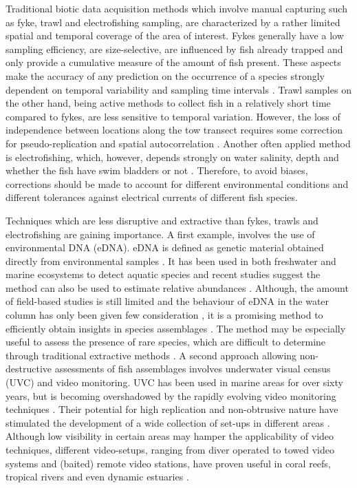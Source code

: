 \documentclass[12pt,authoryear]{elsarticle}
\begin{document}
Traditional biotic data acquisition methods which involve manual capturing such as fyke, trawl and electrofishing sampling, are characterized by a rather limited spatial and temporal coverage of the area of interest. Fykes generally have a low sampling efficiency, are size-selective, are influenced by fish already trapped and only provide a cumulative measure of the amount of fish present. These aspects make the accuracy of any prediction on the occurrence of a species strongly dependent on temporal variability and sampling time intervals \citep{Clavero2006}. Trawl samples on the other hand, being active methods to collect fish in a relatively short time compared to fykes, are less sensitive to temporal variation. However, the loss of independence between locations along the tow transect requires some correction for pseudo-replication and spatial autocorrelation \citep{Dormann2007,Elith2009}. Another often applied method is electrofishing, which, however, depends strongly on water salinity, depth and whether the fish have swim bladders or not \citep{Clavero2006,Reyjol2005}. Therefore, to avoid biases, corrections should be made to account for different environmental conditions and different tolerances against electrical currents of different fish species. 

Techniques which are less disruptive and extractive than fykes, trawls and electrofishing are gaining importance. A first example, involves the use of environmental DNA (eDNA). eDNA is defined as genetic material obtained directly from environmental samples \citep{Thomsen2015}. It has been used in both freshwater and marine ecosystems to detect aquatic species and recent studies suggest the method can also be used to estimate relative abundances \citep{Lacoursiere-Roussel2016,Baldigo2017,Thomsen2012}. Although, the amount of field-based studies is still limited \citep{Sassoubre2016} and the behaviour of eDNA in the water column has only been given few consideration \citep{Shogren2017,Dejean2011}, it is a promising method to efficiently obtain insights in species assemblages \citep{Thomsen2015}. The method may be especially useful to assess the presence of rare species, which are difficult to determine through traditional extractive methods \citep{Laramie2015,Weltz2017,Wilcox2013,Pfleger2016}. A second approach allowing non-destructive assessments of fish assemblages involves underwater visual census (UVC) and video monitoring. UVC has been used in marine areas for over sixty years, but is becoming overshadowed by the rapidly evolving video monitoring techniques \citep{Mallet2014}. Their potential for high replication and non-obtrusive nature have stimulated the development of a wide collection of set-ups in different areas \citep{Mallet2014,Neuswanger2016}. Although low visibility in certain areas may hamper the applicability of video techniques, different video-setups, ranging from diver operated to towed video systems and (baited) remote video stations, have proven useful in coral reefs, tropical rivers and even dynamic estuaries \citep{Mallet2014,Schmid2017,Wartenberg2015,Zintzen2012}. 
\end{document}
